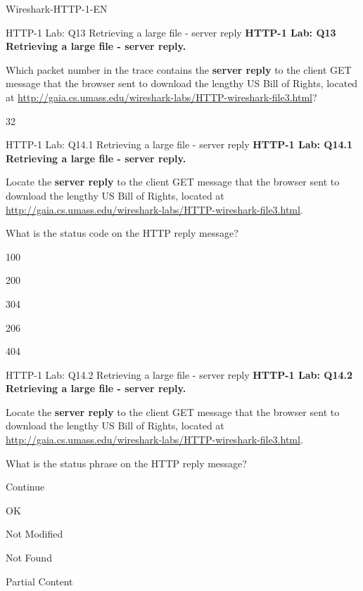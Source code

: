 \documentclass[a4paper]{article}
\begin{document}
\begin{quiz}{Wireshark-HTTP-1-EN}
\begin{shortanswer}[points=1]{HTTP-1 Lab: Q13 Retrieving a large file - server reply}
\textbf{HTTP-1 Lab: Q13 Retrieving a large file - server reply.} 

Which packet number in the trace contains the \textbf{server reply} to the client GET message that the browser sent to download the lengthy US Bill of Rights, located at \href{http://gaia.cs.umass.edu/wireshark-labs/HTTP-wireshark-file3.html}{http://gaia.cs.umass.edu/wireshark-labs/HTTP-wireshark-file3.html}? 
\item 32
\end{shortanswer}

\begin{multi}[points=1,shuffle]{HTTP-1 Lab: Q14.1 Retrieving a large file - server reply}
\textbf{HTTP-1 Lab: Q14.1 Retrieving a large file - server reply.} 

Locate the \textbf{server reply} to the client GET message that the browser sent to download the lengthy US Bill of Rights, located at \href{http://gaia.cs.umass.edu/wireshark-labs/HTTP-wireshark-file3.html}{http://gaia.cs.umass.edu/wireshark-labs/HTTP-wireshark-file3.html}. 

What is the status code on the HTTP reply message? 
\item 100
\item* 200
\item 304
\item 206
\item 404
\end{multi}

\begin{multi}[points=1,shuffle]{HTTP-1 Lab: Q14.2 Retrieving a large file - server reply}
\textbf{HTTP-1 Lab: Q14.2 Retrieving a large file - server reply.} 

Locate the \textbf{server reply} to the client GET message that the browser sent to download the lengthy US Bill of Rights, located at \href{http://gaia.cs.umass.edu/wireshark-labs/HTTP-wireshark-file3.html}{http://gaia.cs.umass.edu/wireshark-labs/HTTP-wireshark-file3.html}.

What is the status phrase on the HTTP reply message? 
\item Continue
\item* OK
\item Not Modified
\item Not Found
\item Partial Content
\end{multi}
	

\end{quiz}
\end{document}
